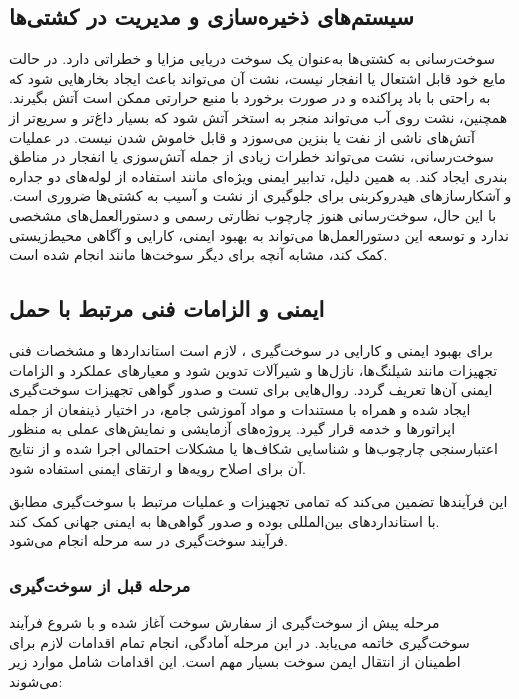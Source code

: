 \subsection{سیستم‌های ذخیره‌سازی و مدیریت 
	در کشتی‌ها}
سوخت‌رسانی
  به کشتی‌ها به‌عنوان یک سوخت دریایی مزایا و خطراتی دارد. 
   در حالت مایع خود قابل اشتعال یا انفجار نیست، نشت آن می‌تواند باعث ایجاد بخارهایی شود که به راحتی با باد پراکنده و در صورت برخورد با منبع حرارتی ممکن است آتش بگیرند. همچنین، نشت
    روی آب می‌تواند منجر به استخر آتش
     شود که بسیار داغ‌تر و سریع‌تر از آتش‌های ناشی از نفت یا بنزین می‌سوزد و قابل خاموش شدن نیست. در عملیات سوخت‌رسانی، نشت 
    می‌تواند خطرات زیادی از جمله آتش‌سوزی یا انفجار در مناطق بندری ایجاد کند. به همین دلیل، تدابیر ایمنی ویژه‌ای مانند استفاده از لوله‌های دو جداره و آشکارسازهای هیدروکربنی برای جلوگیری از نشت و آسیب به کشتی‌ها ضروری است. با این حال، سوخت‌رسانی
     هنوز چارچوب نظارتی رسمی و دستورالعمل‌های مشخصی ندارد و توسعه این دستورالعمل‌ها می‌تواند به بهبود ایمنی، کارایی و آگاهی محیط‌زیستی کمک کند، مشابه آنچه برای دیگر سوخت‌ها مانند 
     انجام شده است.
\subsection{ایمنی و الزامات فنی مرتبط با حمل }
برای بهبود ایمنی و کارایی در سوخت‌گیری ، لازم است استانداردها و مشخصات فنی تجهیزات مانند شیلنگ‌ها، نازل‌ها و شیرآلات تدوین شود و معیارهای عملکرد و الزامات ایمنی آن‌ها تعریف گردد. روال‌هایی برای تست و صدور گواهی تجهیزات سوخت‌گیری ایجاد شده و همراه با مستندات و مواد آموزشی جامع، در اختیار ذینفعان از جمله اپراتورها و خدمه قرار گیرد. پروژه‌های آزمایشی و نمایش‌های عملی به منظور اعتبارسنجی چارچوب‌ها و شناسایی شکاف‌ها یا مشکلات احتمالی اجرا شده و از نتایج آن برای اصلاح رویه‌ها و ارتقای ایمنی استفاده شود.

این فرآیندها تضمین می‌کند که تمامی تجهیزات و عملیات مرتبط با سوخت‌گیری  مطابق با استانداردهای بین‌المللی بوده و صدور گواهی‌ها به ایمنی جهانی کمک کند.
\\
فرآیند سوخت‌گیری در سه مرحله انجام می‌شود.
\subsubsection{مرحله قبل از سوخت‌گیری }
مرحله پیش از سوخت‌گیری 
	 از سفارش سوخت آغاز شده و با شروع فرآیند سوخت‌گیری خاتمه می‌یابد.  
در این مرحله آمادگی، انجام تمام اقدامات لازم برای اطمینان از انتقال ایمن سوخت بسیار مهم است. این اقدامات شامل موارد زیر می‌شوند:

